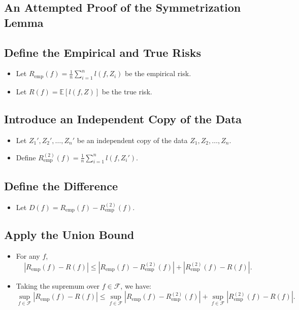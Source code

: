\begin{notechapter}
\section{An Attempted Proof of the Symmetrization Lemma}

\subsection{Define the Empirical and True Risks}
\begin{itemize}
   \item Let \( R_{\text{emp}}(f) = \frac{1}{n} \sum_{i=1}^n l(f, Z_i) \) be the empirical risk.
   \item Let \( R(f) = \mathbb{E}[l(f, Z)] \) be the true risk.
\end{itemize}

\subsection{Introduce an Independent Copy of the Data}
\begin{itemize}
   \item Let \( Z_1', Z_2', \dots, Z_n' \) be an independent copy of the data \( Z_1, Z_2, \dots, Z_n \).
   \item Define \( R_{\text{emp}}^{(2)}(f) = \frac{1}{n} \sum_{i=1}^n l(f, Z_i') \).
\end{itemize}

\subsection{Define the Difference}
\begin{itemize}
   \item Let \( D(f) = R_{\text{emp}}(f) - R_{\text{emp}}^{(2)}(f) \).
\end{itemize}

\subsection{Apply the Union Bound}
\begin{itemize}
   \item For any \( f \), 
         \[
         |R_{\text{emp}}(f) - R(f)| \leq |R_{\text{emp}}(f) - R_{\text{emp}}^{(2)}(f)| + |R_{\text{emp}}^{(2)}(f) - R(f)|.
         \]
   \item Taking the supremum over \( f \in \mathcal{F} \), we have:
         \[
         \sup_{f \in \mathcal{F}} |R_{\text{emp}}(f) - R(f)| \leq \sup_{f \in \mathcal{F}} |R_{\text{emp}}(f) - R_{\text{emp}}^{(2)}(f)| + \sup_{f \in \mathcal{F}} |R_{\text{emp}}^{(2)}(f) - R(f)|.
         \]
\end{itemize}


\end{notechapter}
